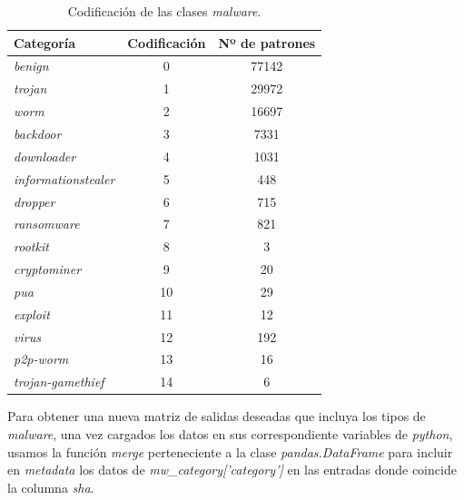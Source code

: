 \vspace{1em}

\begin{table}[th]
	\centering
	\begin{tabular}{ |m{4cm}|c|c| }
		\hline
		\rowcolor{LightCyan}
		Categoría                   & Codificación & Nº de patrones \\
		\hline
		\textit{benign}             & 0            & 77142 \\
		\textit{trojan}             & 1            & 29972 \\
		\textit{worm}               & 2            & 16697 \\
		\textit{backdoor}           & 3            & 7331  \\
		\textit{downloader}         & 4            & 1031  \\
		\textit{informationstealer} & 5            & 448   \\
		\textit{dropper}            & 6            & 715   \\
		\textit{ransomware}         & 7            & 821   \\
		\textit{rootkit}            & 8            & 3     \\
		\textit{cryptominer}        & 9            & 20    \\
		\textit{pua}                & 10           & 29    \\
		\textit{exploit}            & 11           & 12    \\
		\textit{virus}              & 12           & 192   \\
		\textit{p2p-worm}           & 13           & 16    \\
		\textit{trojan-gamethief}   & 14           & 6     \\
		\hline
	\end{tabular}
	\caption{Codificación de las clases \textit{malware}.}
	\label{tabla:codificacion_malware}
\end{table}

Para obtener una nueva matriz de salidas deseadas que incluya los tipos de \textit{malware}, una vez cargados los datos en sus correspondiente variables de \textit{python}, usamos la función \textit{merge} \cite{merge} perteneciente a la clase \textit{pandas.DataFrame} para incluir en \textit{metadata} los datos de \textit{mw\_category['category']} en las entradas donde coincide la columna \textit{sha}.

\vspace{1em}

